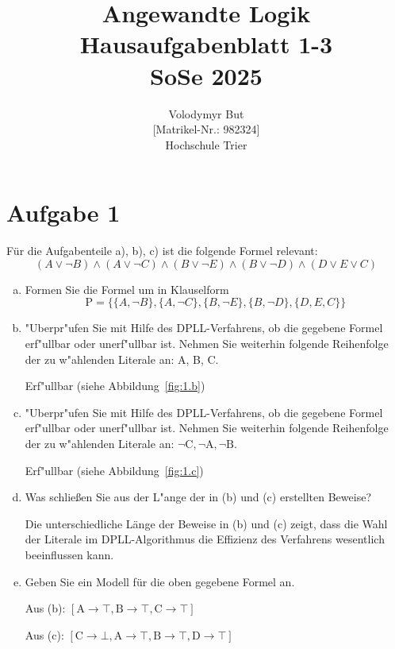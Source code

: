\documentclass[10pt, oneside]{article}
\title{Angewandte Logik\\[15pt]\Large{Hausaufgabenblatt 1-3}\\[10pt]\Large{SoSe 2025}}
\author{Volodymyr But\\[5pt][Matrikel-Nr.: 982324]\\[10pt]Hochschule Trier}
\date{}
\begin{document}
\maketitle
\vspace{25px}

\section{Aufgabe 1}

Für die Aufgabenteile a), b), c) ist die folgende Formel relevant:
\begin{equation*}
    (A \lor \lnot B) \land (A \lor \lnot C) \land (B \lor \lnot E) \land (B \lor \lnot D) \land (D \lor E \lor C)
\end{equation*}
\begin{enumerate}[(a)]
    \item Formen Sie die Formel um in Klauselform
        \begin{equation*}
            \text{P} = \{\{A, \lnot B\}, \{A, \lnot C\}, \{B, \lnot E\}, \{B, \lnot D\}, \{D, E , C\}\}
        \end{equation*}

    \item "Uberpr"ufen Sie mit Hilfe des DPLL-Verfahrens, ob die gegebene
        Formel erf"ullbar oder unerf"ullbar ist. Nehmen Sie weiterhin folgende
        Reihenfolge der zu w"ahlenden Literale an: A, B, C.

        Erf"ullbar (siehe Abbildung~\ref{fig:1.b})

    \item "Uberpr"ufen Sie mit Hilfe des DPLL-Verfahrens, ob die gegebene
        Formel erf"ullbar oder unerf"ullbar ist. Nehmen Sie weiterhin folgende
        Reihenfolge der zu w"ahlenden Literale an: $\lnot\text{C}, \lnot\text{A}, \lnot\text{B}$.

        Erf"ullbar (siehe Abbildung~\ref{fig:1.c})

    \item Was schlie{\ss}en Sie aus der L"ange der in (b) und (c) erstellten Beweise?

        Die unterschiedliche Länge der Beweise in (b) und (c) zeigt, dass die
        Wahl der Literale im DPLL-Algorithmus die Effizienz des Verfahrens
        wesentlich beeinflussen kann.

    \item Geben Sie ein Modell für die oben gegebene Formel an.

        Aus (b): $[\text{A} \rightarrow \top, \text{B} \rightarrow \top, \text{C} \rightarrow \top]$

        Aus (c): $[\text{C} \rightarrow \bot, \text{A} \rightarrow \top, \text{B} \rightarrow \top, \text{D} \rightarrow \top]$

\end{enumerate}
\end{document}
